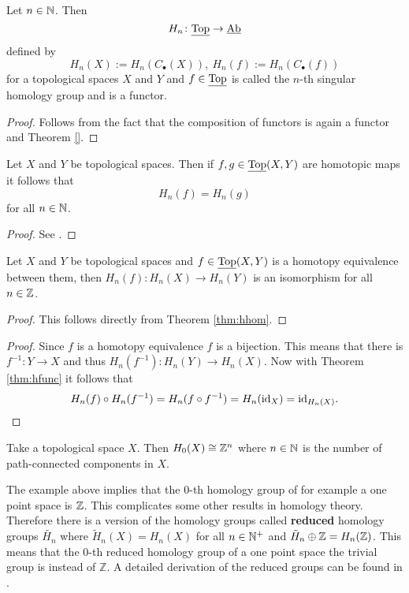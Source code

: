 \begin{thm}\label{thm:hfunc}
  Let $n \in \mathbb{N}$. Then \[H_n\colon \underline{\rm Top} \to \underline{\rm Ab} \]
  defined by \[H_n(X) := H_n(C_\bullet(X)), \: H_n(f) := H_n(C_\bullet(f))\]
  for a topological spaces $X$ and $Y$ and $f \in \underline{\rm Top}$ is called the $n$-th singular homology group and  is a functor. 
\end{thm}

\begin{proof}
  Follows from the fact that the composition of functors is again a functor and Theorem \ref{}.
\end{proof}

\begin{thm}\label{thm:hhom}
  Let $X$ and $Y$ be topological spaces. Then if $f, g\in \underline{\rm Top}(X, Y)$ are homotopic maps it follows that \[H_n(f) = H_n(g)\] for all $n \in \mathbb{N}$.
\end{thm}

\begin{proof}
  See \cite[p. 112f]{hatcher}.
\end{proof}

\begin{col}
  Let $X$ and $Y$ be topological spaces and $f \in \underline{\rm Top}(X, Y)$ is a homotopy equivalence between them, then $H_n(f)\colon H_n(X) \to H_n(Y)$ is an isomorphism for all $n \in \mathbb{Z}$.
\end{col}

\begin{proof}
  This follows directly from Theorem \ref{thm:hhom}.
\end{proof}

\begin{proof}
  Since $f$ is a homotopy equivalence $f$ is a bijection. This means that there is $f^{-1}\colon Y \to X$ and thus $H_n(f^{-1})\colon H_n(Y) \to H_n(X)$. Now with Theorem \ref{thm:hfunc} it follows that 
  \begin{align*}
    H_n(f) \circ H_n(f^{-1}) = H_n(f \circ f^{-1}) = H_n({\rm id}_X) = {\rm id}_{H_n(X)}.
  \end{align*}
\end{proof}

\begin{ex}
  Take a topological space $X$. Then $H_0(X) \cong \mathbb{Z}^n$ where $n \in \mathbb{N}$ is the number of path-connected components in $X$. 
\end{ex}

The example above implies that the $0$-th homology group of for example a one point space is $\mathbb{Z}$. This complicates some other results in homology theory. Therefore there is a version of the homology groups called \textbf{reduced} homology groups $\tilde{H_n}$ where $\tilde{H}_n(X) = H_n(X)$ for all $n \in\mathbb{N}^+$ and $\tilde{H}_n \oplus \mathbb{Z} = H_n(\mathbb{Z})$. This means that the $0$-th reduced homology group of a one point space the trivial group is instead of $\mathbb{Z}$.
A detailed derivation of the reduced groups can be found in \cite[p. 110]{hatcher}.


